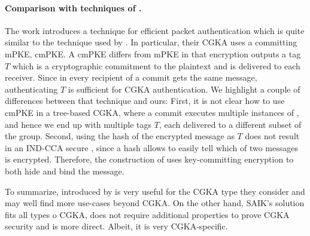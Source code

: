 %



\paragraph{Comparison with techniques of \cite{hashimoto2021cmpke}.}
The work \cite{hashimoto2021cmpke} introduces a technique for efficient packet authentication which is quite similar to the technique used by \saik. In particular, their CGKA uses a committing mPKE, cmPKE. A cmPKE differs from mPKE in that encryption outputs a tag $T$ which is a cryptographic commitment to the plaintext and is delivered to each receiver. Since in \cite{hashimoto2021cmpke} every recipient of a commit gets the same message, authenticating $T$ is sufficient for CGKA authentication.
%
We highlight a couple of differences between that technique and ours:
First, it is not clear how to use cmPKE in a tree-based CGKA, where a commit executes multiple instances of \protCMPKE, and hence we end up with multiple tags $T$, each delivered to a different subset of the group.
%
Second, using the hash of the encrypted message as $T$ does not result in an IND-CCA secure \protCMPKE, since a hash allows to easily tell which of two messages is encrypted. Therefore, the construction of \cite{hashimoto2021cmpke} uses key-committing encryption to both hide and bind the message.

To summarize, \protCMPKE introduced by \cite{hashimoto2021cmpke} is very useful for the CGKA type they consider and may well find more use-cases beyond CGKA. On the other hand, \textsf{SAIK}’s solution fits all types o CGKA, does not require additional properties to prove CGKA security and is more direct. Albeit, it is very CGKA-specific.
